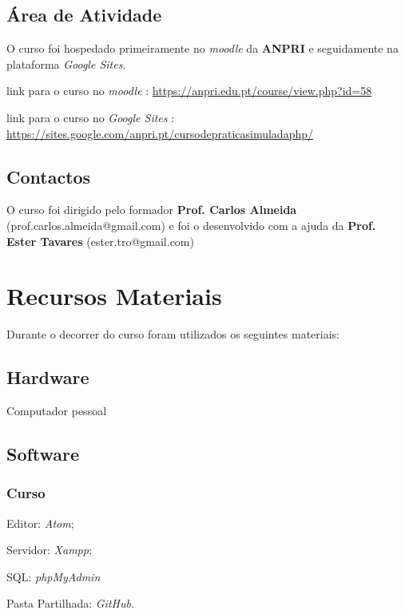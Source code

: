 \documentclass[14pt]{article}
\begin{document}
\subsection{Área de Atividade}
O curso foi hospedado primeiramente no \textit{moodle} da \textbf{ANPRI} e seguidamente na plataforma \textit{Google Sites}.

link para o curso no \textit{moodle} : \url{https://anpri.edu.pt/course/view.php?id=58}

link para o curso no \textit{Google Sites} : \url{https://sites.google.com/anpri.pt/cursodepraticasimuladaphp/}

\subsection{Contactos}
O curso foi dirigido pelo formador \textbf{Prof. Carlos Almeida} (prof.carlos.almeida@gmail.com) e foi o desenvolvido com a ajuda da \textbf{Prof. Ester Tavares} (ester.tro@gmail.com)

\section{Recursos Materiais}
Durante o decorrer do curso foram utilizados os seguintes materiais:

\subsection{Hardware}
\begin{list}{•}
\item Computador pessoal
\end{list}

\subsection{Software}

\subsubsection{Curso}
\begin{list}{•}
\item Editor: \textit{Atom};
\item
\item Servidor: \textit{Xampp};
\item SQL: \textit{phpMyAdmin}
\item Pasta Partilhada: \textit{GitHub}.
\end{list}
\end{document}
